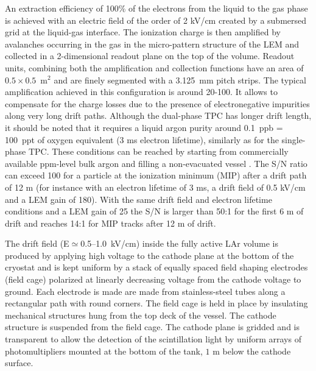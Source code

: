 An extraction efficiency of 100\% of the electrons from the liquid to
the gas phase is achieved with an electric field of the order of 2
kV/cm created by a submersed grid at the liquid-gas interface. The
ionization charge is then amplified by avalanches occurring in the gas
in the micro-pattern structure of the LEM and collected in a
2-dimensional readout plane on the top of the volume. Readout units,
combining both the amplification and collection functions have an area
of $0.5\times 0.5$~m$^2$ and are finely segmented with a 3.125~mm
pitch strips. The typical amplification achieved in this configuration
is around 20-100. It allows to compensate for the charge losses due to
the presence of electronegative impurities along very long drift
paths. Although the dual-phase TPC has longer drift length, it should
be noted that it requires a liquid argon purity around 0.1~ppb =
100~ppt of oxygen equivalent (3 ms electron lifetime), similarly as
for the single-phase TPC. These conditions can be reached by starting
from commercially available ppm-level bulk argon and filling a
non-evacuated vessel \cite{WA105_TDR}. The S/N ratio can exceed 100
for a particle at the ionization minimum (MIP) after a drift path of
12 m (for instance with an electron lifetime of 3 ms, a drift field of
0.5 kV/cm and a LEM gain of 180). With the same drift field and
electron lifetime conditions and a LEM gain of 25 the S/N is larger
than 50:1 for the first 6 m of drift and reaches 14:1 for MIP tracks
after 12 m of drift.

The drift field (E${\simeq}$0.5--1.0~kV/cm) inside the fully active
LAr volume is produced by applying high voltage to the cathode plane
at the bottom of the cryostat and is kept uniform by a stack of
equally spaced field shaping electrodes (field cage) polarized at
linearly decreasing voltage from the cathode voltage to ground. Each
electrode is made are made from stainless-steel tubes along a
rectangular path with round corners. The field cage is held in place
by insulating mechanical structures hung from the top deck of the
vessel.  The cathode structure is suspended from the field cage. The
cathode plane is gridded and is transparent to allow the detection of
the scintillation light by uniform arrays of photomultipliers mounted
at the bottom of the tank, $1$ m below the cathode surface.

